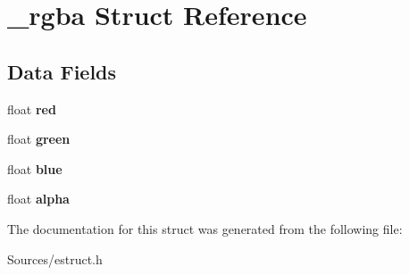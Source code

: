 \hypertarget{struct__rgba}{\section{\-\_\-rgba Struct Reference}
\label{struct__rgba}
}
\subsection*{Data Fields}
\begin{DoxyCompactItemize}
\item 
\hypertarget{struct__rgba_acddf4f34ba92c602d4205ba50e98d603}{float {\bfseries red}}\label{struct__rgba_acddf4f34ba92c602d4205ba50e98d603}

\item 
\hypertarget{struct__rgba_af8d69af46156237d69b44a880e4f486e}{float {\bfseries green}}\label{struct__rgba_af8d69af46156237d69b44a880e4f486e}

\item 
\hypertarget{struct__rgba_a322e0de27f54901aa172ae487dba2914}{float {\bfseries blue}}\label{struct__rgba_a322e0de27f54901aa172ae487dba2914}

\item 
\hypertarget{struct__rgba_ab1551d8043c2aa4410fb7dbb1fe3be7b}{float {\bfseries alpha}}\label{struct__rgba_ab1551d8043c2aa4410fb7dbb1fe3be7b}

\end{DoxyCompactItemize}


The documentation for this struct was generated from the following file\-:\begin{DoxyCompactItemize}
\item 
Sources/estruct.\-h\end{DoxyCompactItemize}
